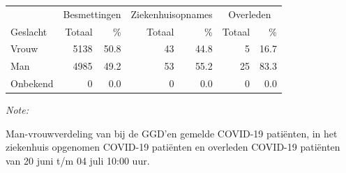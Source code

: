 \documentclass[
  english,
  man,floatsintext]{apa6}
\begin{document}
\begin{table}
\centering\begingroup\fontsize{11}{13}\selectfont

\begin{threeparttable}
\begin{tabular}{lrrrrrr}
\toprule
\multicolumn{1}{c}{ } & \multicolumn{2}{c}{Besmettingen} & \multicolumn{2}{c}{Ziekenhuisopnames} & \multicolumn{2}{c}{Overleden} \\
\cmidrule(l{3pt}r{3pt}){2-3} \cmidrule(l{3pt}r{3pt}){4-5} \cmidrule(l{3pt}r{3pt}){6-7}
Geslacht & Totaal & \% & Totaal & \% & Totaal & \%\\
\midrule
Vrouw & 5138 & 50.8 & 43 & 44.8 & 5 & 16.7\\
Man & 4985 & 49.2 & 53 & 55.2 & 25 & 83.3\\
Onbekend & 0 & 0.0 & 0 & 0.0 & 0 & 0.0\\
\bottomrule
\end{tabular}
\begin{tablenotes}
\item \textit{Note: } 
\item Man-vrouwverdeling van bij de GGD’en gemelde COVID-19 patiënten, in het ziekenhuis opgenomen COVID-19 patiënten en overleden COVID-19 patiënten van 20 juni t/m 04 juli 10:00 uur.
\end{tablenotes}
\end{threeparttable}
\endgroup{}
\end{table}
\newpage
\end{document}

